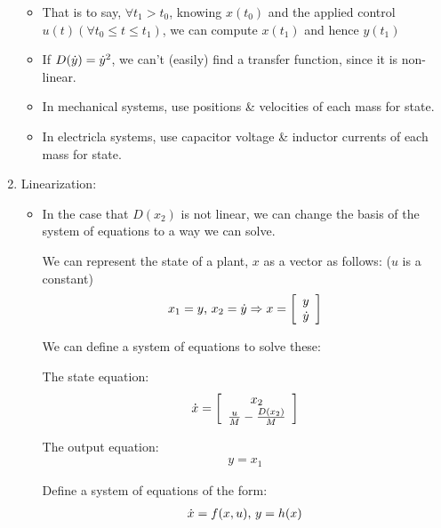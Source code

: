 \begin{enumerate}
\begin{itemize}
            \item That is to say, $\forall t_1 > t_0$, knowing $x(t_0)$ and the applied control $u(t) (\forall t_0 \le t \le t_1)$, we can compute $x(t_1)$ and hence $y(t_1)$

            \item If $D(\dot{y}) = \dot{y}^2$, we can't (easily) find a transfer function, since it is non-linear.

            \item In mechanical systems, use positions \& velocities of each mass for state.
            \item In electricla systems, use capacitor voltage \& inductor currents of each mass for state.
        \end{itemize}
    \item Linearization:
        \begin{itemize}
            \item In the case that $D(x_2)$ is not linear, we can change the basis of the system of equations to a way we can solve.

                We can represent the state of a plant, $x$ as a vector as follows: ($u$ is a constant)
                \begin{align*} x_1 = y \text{, } x_2 = \dot{y} \Rightarrow x = \left[ \begin{array}{c} y \\ \dot{y} \end{array} \right]\end{align*}

                We can define a system of equations to solve these:


                The state equation:
                \begin{align*} \dot{x} = \left[ \begin{array}{c} x_2 \\ \frac{u}{M} - \frac{D(x_2)}{M} \end{array} \right]\end{align*}

                The output equation:
                \begin{align*} y =  x_1 \end{align*}

                Define a system of equations of the form:
                    \begin{align*} \dot{x} = f(x, u) \text{, } y = h(x) \end{align*}


\end{itemize}
\end{enumerate}
